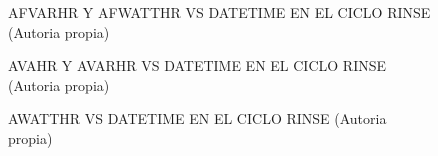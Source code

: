 \begin{figure}[H]
  \hfill
  \hfill
  \hfill
  \caption{AFVARHR Y AFWATTHR VS DATETIME EN EL CICLO RINSE (Autoria propia)}
  \end{figure}
\begin{figure}[H]
  \hfill
  \hfill
  \hfill
  \caption{AVAHR Y AVARHR VS DATETIME EN EL CICLO RINSE (Autoria propia)}
  \end{figure}
\begin{figure}[H]
  \hfill
  \hfill
  \caption{AWATTHR VS DATETIME EN EL CICLO RINSE (Autoria propia)}
  \end{figure}
